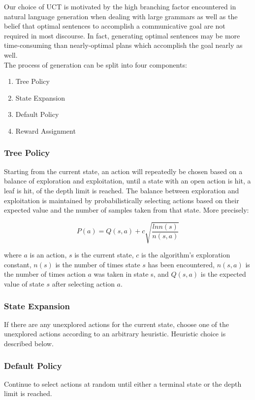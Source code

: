 Our choice of UCT is motivated by the high branching factor encountered in natural language generation when dealing with
large grammars as well as the belief that optimal sentences to accomplish a communicative goal are not required in most
discourse. In fact, generating optimal sentences may be more time-consuming than nearly-optimal plans which accomplish
the goal nearly as well.\\

The process of generation can be split into four components:
\begin{enumerate}
\item Tree Policy
\item State Expansion
\item Default Policy
\item Reward Assignment
\end{enumerate}

\subsubsection{Tree Policy}
Starting from the current state, an action will repeatedly be chosen based on a balance of exploration and exploitation,
until a state with an open action is hit, a leaf is hit, of the depth limit is reached. The balance between exploration
and exploitation is maintained by probabilistically selecting actions based on their expected value and the number of
samples taken from that state. More precisely:

$$P(a) = Q(s,a) + c\sqrt{\frac{ln n(s)}{n(s,a)}}$$

where $a$ is an action, $s$ is the current state, $c$ is the algorithm's exploration constant, $n(s)$ is the number of
times state $s$ has been encountered, $n(s,a)$ is the number of times action $a$ was taken in state s, and $Q(s,a)$ is
the expected value of state $s$ after selecting action $a$.

\subsubsection{State Expansion}
If there are any unexplored actions for the current state, choose one of the unexplored actions according to an
arbitrary heuristic. Heuristic choice is described below.

\subsubsection{Default Policy}
Continue to select actions at random until either a terminal state or the depth limit is reached.

